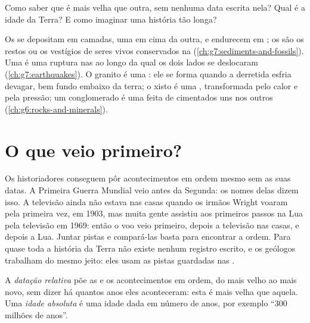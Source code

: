 Como saber que  é mais velha que outra, sem nenhuma data escrita
nela? Qual é a idade da Terra? E como imaginar uma história tão longa?

\begin{recall}
Os  se depositam em camadas, uma em cima da outra, e endurecem
em ; os  são os restos ou os vestígios de seres
vivos conservados na  (\cref{ch:g7:sediments-and-fossils}). Uma
\emph{} é uma ruptura nas  ao longo da qual os dois lados se
deslocaram (\cref{ch:g7:earthquakes}). O granito é uma \emph{}: ele se forma quando a  derretida esfria devagar, bem fundo
embaixo da terra; o xisto é uma \emph{}, transformada
pelo calor e pela pressão; um conglomerado é uma  feita
de  cimentados uns nos outros (\cref{ch:g6:rocks-and-minerals}).
\end{recall}

\section{O que veio primeiro?}

Os historiadores conseguem pôr acontecimentos em ordem mesmo sem as suas
datas. A Primeira Guerra Mundial veio antes da Segunda: os nomes delas
dizem isso. A televisão ainda não estava nas casas quando os irmãos
Wright voaram pela primeira vez, em 1903, mas muita gente assistiu aos
primeiros passos na Lua pela televisão em 1969: então o voo veio
primeiro, depois a televisão nas casas, e depois a Lua. Juntar pistas e
compará-las basta para encontrar a ordem. Para quase toda a história da
Terra não existe nenhum registro escrito, e os geólogos trabalham do
mesmo jeito: eles usam as pistas guardadas nas .

\begin{definition}\label{def:g7:geological-time:relative-dating}
A \emph{datação relativa} põe as  e os
acontecimentos em ordem, do mais velho ao mais novo, sem dizer há quantos
anos eles aconteceram: esta  é mais velha que aquela. Uma
\emph{idade absoluta} é uma idade dada em número de
anos, por exemplo ``\num{300} milhões de anos''.
\end{definition}

